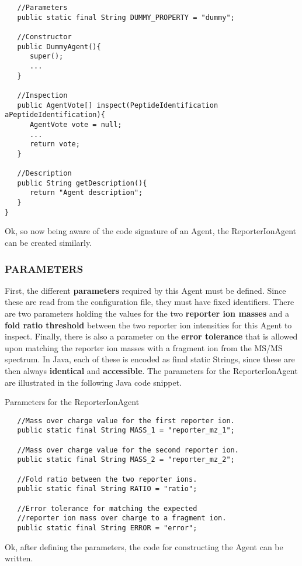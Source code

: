 {\begin{algorithm}[H]
\begin{verbatim}
   //Parameters
   public static final String DUMMY_PROPERTY = "dummy";
	
   //Constructor
   public DummyAgent(){
      super();
      ...
   }
	
   //Inspection
   public AgentVote[] inspect(PeptideIdentification aPeptideIdentification){
      AgentVote vote = null;
      ...
      return vote;
   }
	
   //Description
   public String getDescription(){
      return "Agent description";
   }
}
\end{verbatim}
\end{algorithm}
%
\npar Ok, so now being aware of the code signature of an Agent, the ReporterIonAgent can be created similarly.
\subsubsection{PARAMETERS}
\npar First, the different \textbf{parameters} required by this Agent must be defined. Since these are read from the configuration file, they must have fixed identifiers. There are two parameters holding the values for the two \textbf{reporter ion masses} and a \textbf{fold ratio threshold} between the two reporter ion intensities for this Agent to inspect. Finally, there is also a parameter on the \textbf{error tolerance} that is allowed upon matching the reporter ion masses with a fragment ion from the MS/MS spectrum.
\npar In Java, each of these is encoded as final static Strings, since these are then always \textbf{identical }and \textbf{accessible}.
\npar The parameters for the ReporterIonAgent are illustrated in the following Java code snippet.
%
%
\begin{algorithm}[H]
\caption{Parameters for the ReporterIonAgent}
\scriptsize
\vspace{0.3cm}
\begin{verbatim}
   //Mass over charge value for the first reporter ion.
   public static final String MASS_1 = "reporter_mz_1";

   //Mass over charge value for the second reporter ion.
   public static final String MASS_2 = "reporter_mz_2";

   //Fold ratio between the two reporter ions. 
   public static final String RATIO = "ratio";

   //Error tolerance for matching the expected
   //reporter ion mass over charge to a fragment ion.
   public static final String ERROR = "error";
\end{verbatim}
\end{algorithm}
%
%
\npar Ok, after defining the parameters, the code for constructing the Agent can be written.
}
